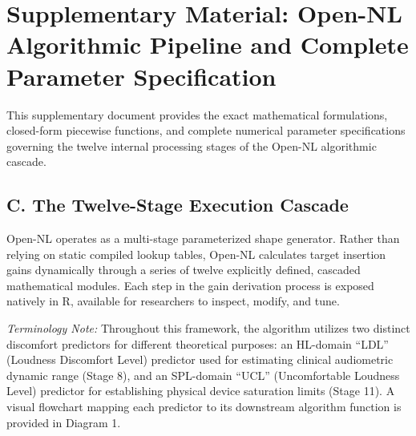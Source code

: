 \documentclass[
]{article}
\author{}
\date{}
\begin{document}
\section{Supplementary Material: Open-NL Algorithmic Pipeline and
Complete Parameter
Specification}\label{supplementary-material-open-nl-algorithmic-pipeline-and-complete-parameter-specification}

This supplementary document provides the exact mathematical
formulations, closed-form piecewise functions, and complete numerical
parameter specifications governing the twelve internal processing stages
of the Open-NL algorithmic cascade.

\subsection{C. The Twelve-Stage Execution
Cascade}\label{c.-the-twelve-stage-execution-cascade}

Open-NL operates as a multi-stage parameterized shape generator. Rather
than relying on static compiled lookup tables, Open-NL calculates target
insertion gains dynamically through a series of twelve explicitly
defined, cascaded mathematical modules. Each step in the gain derivation
process is exposed natively in R, available for researchers to inspect,
modify, and tune.

\emph{Terminology Note:} Throughout this framework, the algorithm
utilizes two distinct discomfort predictors for different theoretical
purposes: an HL-domain ``LDL'' (Loudness Discomfort Level) predictor
used for estimating clinical audiometric dynamic range (Stage 8), and an
SPL-domain ``UCL'' (Uncomfortable Loudness Level) predictor for
establishing physical device saturation limits (Stage 11). A visual
flowchart mapping each predictor to its downstream algorithm function is
provided in Diagram 1.
\end{document}
